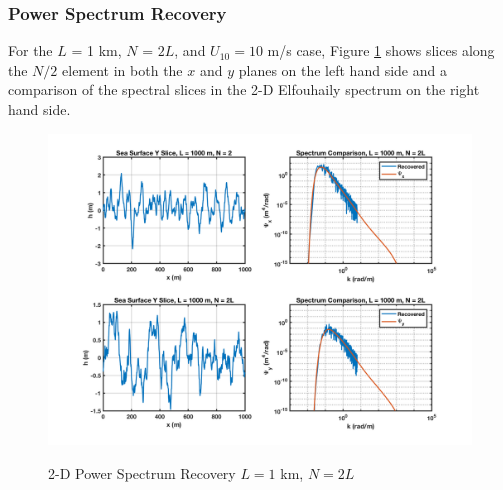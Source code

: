 \subsubsection{Power Spectrum Recovery}
For the $L$ = 1 km, $N$ = $2L$, and $U_{10} = 10$ m/s case, Figure \ref{os_fig:10} shows slices along the $N/2$ element in both the $x$ and $y$ planes on the left hand side and a comparison of the spectral slices in the 2-D Elfouhaily spectrum on the right hand side. 
\begin{figure}[H]
  \begin{center}
\includegraphics[width=6in]{../media/Ocean_Surface/sea_surface_2d_slices_1000.png}
  \end{center}
  \renewcommand{\baselinestretch}{1} \small\normalsize
  \begin{quote}
    \caption[2-D Power Spectrum Recovery $L = 1$ km, $N = 2L$]{2-D Power Spectrum Recovery $L = 1$ km, $N = 2L$\label{os_fig:10}}
  \end{quote}
\end{figure}
\renewcommand{\baselinestretch}{2} \small\normalsize

